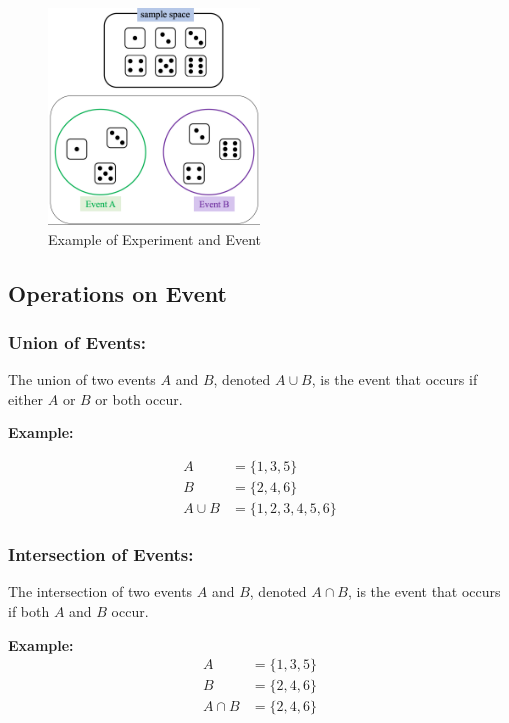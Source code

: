 \documentclass{article}
\begin{document}
\begin{figure}[h]
    \centering
    \includegraphics[width=0.5\textwidth]{images/image1.png}
    \caption{Example of Experiment and Event}
    \label{fig:experiment-event}
\end{figure}

\subsection*{Operations on Event}

\subsubsection*{Union of Events:}
The union of two events $A$ and $B$, denoted $A \cup B$, is the event that occurs if either $A$ or $B$ or both occur.

\textbf{Example:}

\begin{align*}
    A &= \{1, 3, 5\} \\
    B &= \{2, 4, 6\} \\
    A \cup B &= \{1, 2, 3, 4, 5, 6\}
\end{align*}


\subsubsection*{Intersection of Events:}
The intersection of two events $A$ and $B$, denoted $A \cap B$, is the event that occurs if both $A$ and $B$ occur.

\textbf{Example:}
\begin{align*}
    A &= \{1, 3, 5\} \\
    B &= \{2, 4, 6\} \\
    A \cap B &= \{2, 4, 6\}
\end{align*}
\end{document}
